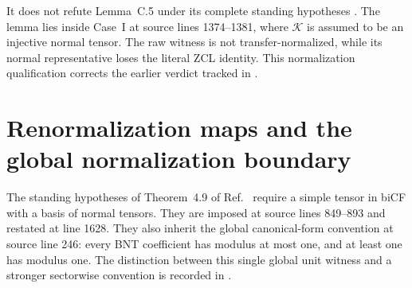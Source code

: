 \documentclass{article}
\begin{document}
It does not refute Lemma~C.5 under its complete standing hypotheses
\cite[Appendix~C.2]{Cirac2016MPDO_arXiv}. The lemma lies inside Case~I at
source lines 1374--1381, where $\mathcal K$ is assumed to be an injective
normal tensor. The raw witness is not transfer-normalized, while its normal
representative loses the literal ZCL identity. This normalization
qualification corrects the earlier verdict tracked in .

\section{Renormalization maps and the global normalization boundary}
\label{sec:cpgsv17_global_normalization}

The standing hypotheses of Theorem~4.9 of
Ref.~\cite{Cirac2016MPDO_arXiv} require a simple tensor in biCF with a basis of
normal tensors. They are imposed at source lines 849--893 and restated at
line 1628. They also inherit the global canonical-form convention at source
line 246: every BNT coefficient has modulus at most one, and at least one has
modulus one. The distinction between this single global unit witness and a
stronger sectorwise convention is recorded in
.
\end{document}
